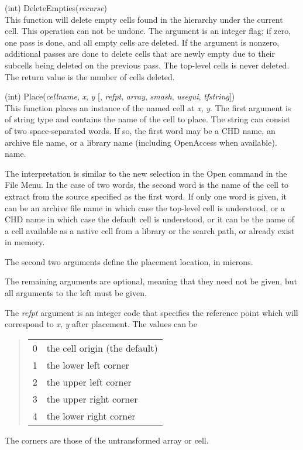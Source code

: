 \begin{description}
\item{(int) \vt DeleteEmpties({\it recurse\/})}\\
This function will delete empty cells found in the hierarchy under the
current cell.  This operation can not be undone.  The argument is an
integer flag; if zero, one pass is done, and all empty cells are
deleted.  If the argument is nonzero, additional passes are done to
delete cells that are newly empty due to their subcells being deleted
on the previous pass.  The top-level cells is never deleted.  The
return value is the number of cells deleted.

\item{(int) \vt Place({\it cellname\/}, {\it x\/}, {\it y\/} [, {\it refpt\/},
  {\it array\/}, {\it smash\/}, {\it usegui\/}, {\it tfstring\/}])}\\
This function places an instance of the named cell at {\it x\/}, {\it
y\/}.  The first argument is of string type and contains the name of
the cell to place.  The string can consist of two space-separated
words.  If so, the first word may be a CHD name, an archive file name,
or a library
\ifoa
name (including OpenAccess when available).
\else
name.
\fi

The interpretation is similar to the {\cb new} selection in the {\cb
Open} command in the {\cb File Menu}.  In the case of two words, the
second word is the name of the cell to extract from the source
specified as the first word.  If only one word is given, it can be an
archive file name in which case the top-level cell is understood, or a
CHD name in which case the default cell is understood, or it can be
the name of a cell available as a native cell from a library or the
search path, or already exist in memory.

The second two arguments define the placement location, in microns.

The remaining arguments are optional, meaning that they need not
be given, but all arguments to the left must be given.
       
The {\it refpt} argument is an integer code that specifies the
reference point which will correspond to {\it x\/}, {\it y} after
placement.  The values can be
\begin{quote}
\begin{tabular}{ll}
0 & the cell origin (the default)\\
1 & the lower left corner\\
2 & the upper left corner\\
3 & the upper right corner\\
4 & the lower right corner\\
\end{tabular}
\end{quote}
The corners are those of the untransformed array or cell.
       

\end{description}
